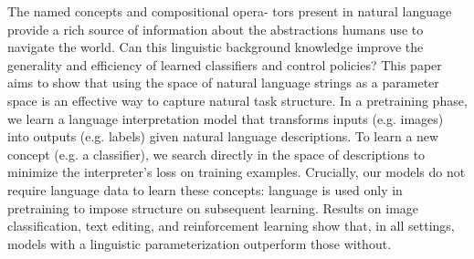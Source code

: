 The named concepts and compositional opera- tors present in natural language provide a rich source of information about the abstractions humans use to navigate the world. Can this linguistic background knowledge improve the generality and efficiency of learned classifiers and control policies? This paper aims to show that using the space of natural language strings as a parameter space is an effective way to capture natural task structure. In a pretraining phase, we learn a language interpretation model that transforms inputs (e.g. images) into outputs (e.g. labels) given natural language descriptions. To learn a new concept (e.g. a classifier), we search directly in the space of descriptions to minimize the interpreter's loss on training examples. Crucially, our models do not require language data to learn these concepts: language is used only in pretraining to impose structure on subsequent learning. Results on image classification, text editing, and reinforcement learning show that, in all settings, models with a linguistic parameterization outperform those without.
